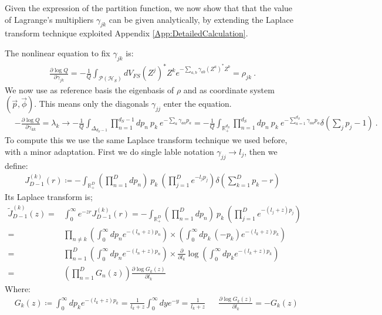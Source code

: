 \documentclass[draft,nofootinbib,pre,twocolumn,showpacs,showkeys,groupaddress,preprintnumbers,floatfix]{revtex4-1}
\newcommand{\1}{\mathbbm{1}}
\begin{document}
Given the expression of the partition function, we now show that that the value
of Lagrange's multipliers $\gamma_{jk}$ can be given analytically, by extending
the Laplace transform technique exploited Appendix
\ref{App:DetailedCalculation}.

The nonlinear equation to fix $\gamma_{jk}$ is:
\begin{align*}
\frac{\partial \log Q}{\partial \gamma_{jk}} = -\frac{1}{Q}\int_{\mathcal{P}(\mathcal{H}_S)}\!\!\!\!\!\! dV_{FS} (Z^{j})^{*}Z^k e^{-\sum_{a,b}\gamma_{ab}(Z^{a})^{*}Z^b} = \rho_{jk}
  ~.
\end{align*}
We now use as reference basis the eigenbasis of $\rho$ and as coordinate system $(\vec{p},\vec{\phi})$. This means only the diagonals $\gamma_{jj}$ enter the equation.
\begin{align*}
&-\frac{\partial \log Q}{\partial \gamma_{kk}} = \lambda_k \to  - \frac{1}{Q}\int_{\Delta_{d_S-1}} \prod_{n=1}^{d_S-1}dp_n~p_k~e^{-\sum_{a}\gamma_{aa}p_a} = - \frac{1}{Q}\int_{\mathbb{R}^{d_S}_{+}} \prod_{n=1}^{d_S}dp_n~p_k~e^{-\sum_{a=1}^{d_S}\gamma_{aa}p_a} \delta\left(\sum_j p_j - 1\right)
  ~.
\end{align*}
To compute this we use the same Laplace transform technique we used before,
with a minor adaptation. First we do single lable notation $\gamma_{jj} \to
l_j$, then we define:
\begin{align*}
J_{D-1}^{(k)}(r)\coloneqq -\int_{\mathbb{R}^D_{+}} \left( \prod_{n=1}^D dp_n\right)~p_k~\left(\prod_{j=1}^D e^{-l_j p_j}\right) \delta \left( \sum_{k=1}^D p_k - r\right)
\end{align*}
Its Laplace transform is;
\begin{align*}
\tilde{J}_{D-1}^{(k)}(z) = & \int_0^\infty e^{-zr}J_{D-1}^{(k)}(r) = -\int_{\mathbb{R}^D_+} \left( \prod_{n=1}^D dp_n\right)~p_k~\left(\prod_{j=1}^D e^{-(l_j+z) p_j}\right) \\
= & \prod_{n \neq k}\left( \int_{0}^{\infty} \!\!\!dp_n e^{-(l_n+z)p_n}\right) \times \left( \int_0^{\infty} \!\!\! dp_k ~(-p_k) e^{-(l_k+z)p_k}\right)\\
= & \prod_{n=1}^{D} \left( \int_{0}^{\infty} \!\!\!dp_n e^{-(l_n+z)p_n}\right) \times \frac{\partial}{\partial l_k} \log \left( \int_{0}^{\infty} \!\!\!dp_k e^{-(l_k+z)p_k}\right)\\
= & \left(\prod_{n=1}^D G_n(z)\right) \frac{\partial \log G_k(z)}{\partial l_k}
\end{align*}
Where:
\begin{align*}
&G_k(z)\coloneqq \int_{0}^{\infty} \!\!\!dp_k e^{-(l_k+z)p_k} = \frac{1}{l_k+z}\int_0^{\infty} dy e^{-y} = \frac{1}{l_k+z} && \frac{\partial \log  G_k(z)}{\partial l_k} = - G_k(z)
\end{align*}
\end{document}
